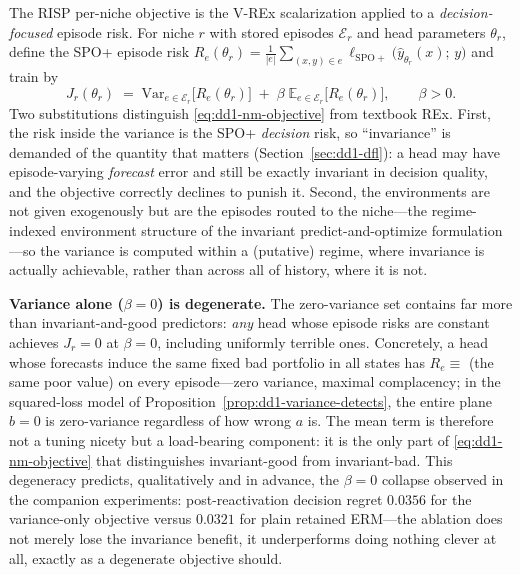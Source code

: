 \documentclass[11pt,a4paper]{article}
\theoremstyle{definition}
\theoremstyle{plain}
\newcommand{\E}{\mathbb{E}}
\newcommand{\Var}{\mathrm{Var}}
\newcommand{\nm}{\textsc{RISP}}
\begin{document}
The \nm{} per-niche objective is the V-REx scalarization applied to a
\emph{decision-focused} episode risk. For niche $r$ with stored episodes
$\mathcal{E}_r$ and head parameters $\theta_r$, define the SPO+ episode risk
$R_e(\theta_r) = \frac{1}{|e|}\sum_{(x, y) \in e}
\ell_{\mathrm{SPO+}}\bigl( \hat y_{\theta_r}(x);\, y \bigr)$ and train by
\begin{equation}
\label{eq:dd1-nm-objective}
J_r(\theta_r)
\;=\; \Var_{e \in \mathcal{E}_r}\bigl[ R_e(\theta_r) \bigr]
\;+\; \beta\; \E_{e \in \mathcal{E}_r}\bigl[ R_e(\theta_r) \bigr],
\qquad \beta > 0 .
\end{equation}
Two substitutions distinguish \eqref{eq:dd1-nm-objective} from textbook REx.
First, the risk inside the variance is the SPO+ \emph{decision} risk, so
``invariance'' is demanded of the quantity that matters
(Section~\ref{sec:dd1-dfl}): a head may have episode-varying \emph{forecast}
error and still be exactly invariant in decision quality, and the objective
correctly declines to punish it. Second, the environments are not given
exogenously but are the episodes routed to the niche---the regime-indexed
environment structure of the invariant predict-and-optimize formulation
\cite{yan2026invpnco}---so the variance is computed within a (putative)
regime, where invariance is actually achievable, rather than across all of
history, where it is not.

\begin{warning}
\textbf{Variance alone ($\beta = 0$) is degenerate.} The zero-variance set
contains far more than invariant-and-good predictors: \emph{any} head whose
episode risks are constant achieves $J_r = 0$ at $\beta = 0$, including
uniformly terrible ones. Concretely, a head whose forecasts induce the same
fixed bad portfolio in all states has $R_e \equiv$ (the same poor value) on
every episode---zero variance, maximal complacency; in the squared-loss model
of Proposition~\ref{prop:dd1-variance-detects}, the entire plane $b = 0$ is
zero-variance regardless of how wrong $a$ is. The mean term is therefore not
a tuning nicety but a load-bearing component: it is the only part of
\eqref{eq:dd1-nm-objective} that distinguishes invariant-good from
invariant-bad. This degeneracy predicts, qualitatively and in advance, the
$\beta = 0$ collapse observed in the companion experiments: post-reactivation
decision regret $0.0356$ for the variance-only objective versus $0.0321$ for
plain retained ERM---the ablation does not merely lose the invariance
benefit, it underperforms doing nothing clever at all, exactly as a
degenerate objective should.
\end{warning}
\end{document}
